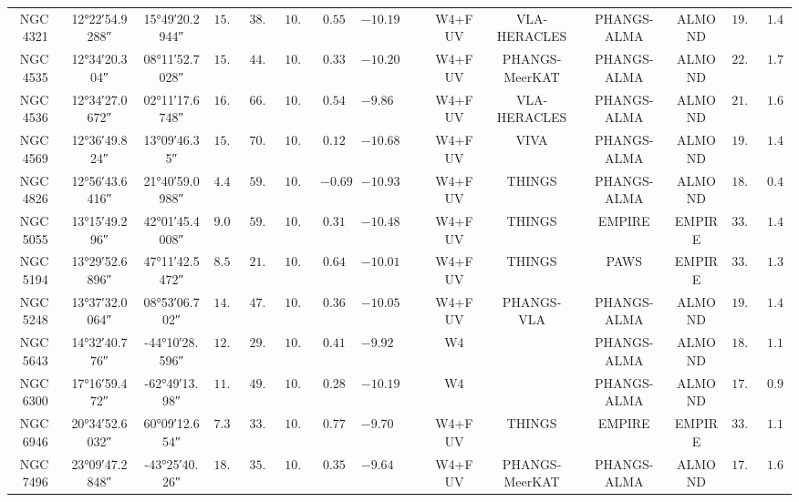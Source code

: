 \documentclass[letter, longauth]{aa} %
\newcommand*{\ra}[2][]{{
                \ang[
                angle-symbol-degree=\textsuperscript{h},
                angle-symbol-minute=\textsuperscript{m},
                angle-symbol-second=\textsuperscript{s},
                #1]{#2}%
}}
\newcommand{\cmark}{\textcolor{green}{\ding{51}}}
\newcommand{\xmark}{\textcolor{red}{\ding{55}}}
\begin{document}
\begin{appendix}
\begin{table}
\begin{center}
{\begin{tabular}{cccccccccccccccc}
NGC\,4321 & \ra{12;22;54.9288} & \ang{+15;49;20.2944} & $15.21$ & $38.50$ & $10.75$ & $0.55$ & $-10.19$ & \cmark & \xmark & W4+FUV & VLA-HERACLES & PHANGS-ALMA & ALMOND & $19.60$ & $1.45$ \\
NGC\,4535 & \ra{12;34;20.304} & \ang{+08;11;52.7028} & $15.77$ & $44.70$ & $10.53$ & $0.33$ & $-10.20$ & \cmark & \xmark & W4+FUV & PHANGS-MeerKAT & PHANGS-ALMA & ALMOND & $22.80$ & $1.74$ \\
NGC\,4536 & \ra{12;34;27.0672} & \ang{+02;11;17.6748} & $16.25$ & $66.00$ & $10.40$ & $0.54$ & $-9.86$ & \cmark & \xmark & W4+FUV & VLA-HERACLES & PHANGS-ALMA & ALMOND & $21.50$ & $1.69$ \\
NGC\,4569 & \ra{12;36;49.824} & \ang{+13;09;46.35} & $15.76$ & $70.00$ & $10.81$ & $0.12$ & $-10.68$ & \cmark & \cmark & W4+FUV & VIVA & PHANGS-ALMA & ALMOND & $19.20$ & $1.47$ \\
NGC\,4826 & \ra{12;56;43.6416} & \ang{+21;40;59.0988} & $4.41$ & $59.10$ & $10.24$ & $-0.69$ & $-10.93$ & \xmark & \cmark & W4+FUV & THINGS & PHANGS-ALMA & ALMOND & $18.70$ & $0.40$ \\
NGC\,5055 & \ra{13;15;49.296} & \ang{+42;01;45.4008} & $9.02$ & $59.00$ & $10.79$ & $0.31$ & $-10.48$ & \xmark & \xmark & W4+FUV & THINGS & EMPIRE & EMPIRE & $33.30$ & $1.46$ \\
NGC\,5194 & \ra{13;29;52.6896} & \ang{+47;11;42.5472} & $8.56$ & $21.00$ & $10.65$ & $0.64$ & $-10.01$ & \xmark & \cmark & W4+FUV & THINGS & PAWS & EMPIRE & $33.30$ & $1.38$ \\
NGC\,5248 & \ra{13;37;32.0064} & \ang{+08;53;06.702} & $14.87$ & $47.40$ & $10.41$ & $0.36$ & $-10.05$ & \cmark & \xmark & W4+FUV & PHANGS-VLA & PHANGS-ALMA & ALMOND & $19.90$ & $1.43$ \\
NGC\,5643 & \ra{14;32;40.776} & \ang{-44;10;28.596} & $12.68$ & $29.90$ & $10.34$ & $0.41$ & $-9.92$ & \cmark & \cmark & W4 & \xmark & PHANGS-ALMA & ALMOND & $18.00$ & $1.11$ \\
NGC\,6300 & \ra{17;16;59.472} & \ang{-62;49;13.98} & $11.58$ & $49.60$ & $10.47$ & $0.28$ & $-10.19$ & \cmark & \cmark & W4 & \xmark & PHANGS-ALMA & ALMOND & $17.70$ & $0.99$ \\
NGC\,6946 & \ra{20;34;52.6032} & \ang{+60;09;12.654} & $7.34$ & $33.00$ & $10.47$ & $0.77$ & $-9.70$ & \cmark & \xmark & W4+FUV & THINGS & EMPIRE & EMPIRE & $33.30$ & $1.18$ \\
NGC\,7496 & \ra{23;09;47.2848} & \ang{-43;25;40.26} & $18.72$ & $35.90$ & $10.00$ & $0.35$ & $-9.64$ & \cmark & \cmark & W4+FUV & PHANGS-MeerKAT & PHANGS-ALMA & ALMOND & $17.90$ & $1.62$ \\

\end{tabular}}
\end{center}
\end{table}
\end{appendix}
\end{document}
